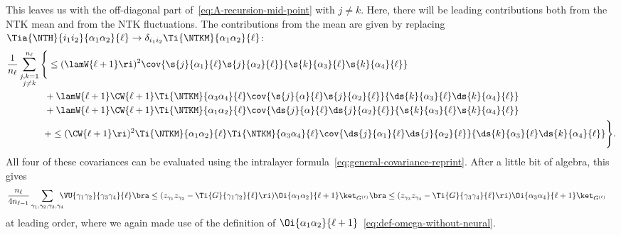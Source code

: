This leaves us with the off-diagonal part of~\eqref{eq:A-recursion-mid-point} with $j\ne k$. Here, there will be leading contributions both from the NTK mean and from the NTK fluctuations. The contributions from the mean are given by
replacing $\Tia{\NTH}{i_1i_2}{\alpha_1\alpha_2}{\ell} \to \delta_{i_1i_2}\Ti{\NTKM}{\alpha_1\alpha_2}{\ell}$:
\begin{align}\label{eq:A-recursion-mean}
&\frac{1}{n_{\ell}}\sum_{\substack{ j,k=1\\j\ne k}}^{n_{\ell}}\Bigg\{\le(\lamW{\ell+1}\ri)^2\cov{\s{j}{\alpha_1}{\ell} \s{j}{\alpha_2}{\ell}}{\s{k}{\alpha_3}{\ell} \s{k}{\alpha_4}{\ell}}   \\
&\quad \quad \quad \quad +\lamW{\ell+1}\CW{\ell+1}\Ti{\NTKM}{\alpha_3\alpha_4}{\ell}\cov{\s{j}{\alpha}{\ell} \s{j}{\alpha_2}{\ell}}{\ds{k}{\alpha_3}{\ell} \ds{k}{\alpha_4}{\ell} } \nonumber\\
&\quad \quad \quad \quad +\lamW{\ell+1}\CW{\ell+1}\Ti{\NTKM}{\alpha_1\alpha_2}{\ell}\cov{\ds{j}{\alpha}{\ell} \ds{j}{\alpha_2}{\ell}}{\s{k}{\alpha_3}{\ell} \s{k}{\alpha_4}{\ell}  }\nonumber\\
&\quad \quad \quad \quad +\le(\CW{\ell+1}\ri)^2\Ti{\NTKM}{\alpha_1\alpha_2}{\ell}\Ti{\NTKM}{\alpha_3\alpha_4}{\ell}\cov{\ds{j}{\alpha_1}{\ell} \ds{j}{\alpha_2}{\ell}}{\ds{k}{\alpha_3}{\ell} \ds{k}{\alpha_4}{\ell}}\Bigg\} .\nonumber
\end{align}
All four of these covariances can be evaluated using the intralayer formula~\eqref{eq:general-covariance-reprint}. After a little bit of algebra, this gives 
\begin{align}\label{eq:NTHA-piece2}%
&\frac{n_{\ell}}{4n_{\ell-1}}  \sum_{\gamma_1, \gamma_2, \gamma_3, \gamma_4} \!\!\!\!
\VU{\gamma_1 \gamma_2}{\gamma_3 \gamma_4}{\ell}
\bra\le(z_{\gamma_1} z_{\gamma_2} -\Ti{G}{\gamma_1 \gamma_2}{\ell} \ri)\Oi{\alpha_1\alpha_2}{\ell+1}\ket_{G^{(\ell)}}
\bra\le(z_{\gamma_3} z_{\gamma_4} -\Ti{G}{\gamma_3 \gamma_4}{\ell} \ri)\Oi{\alpha_3\alpha_4}{\ell+1}\ket_{G^{(\ell)}}\, 
\end{align}
at leading order, where we again made use of the definition of $\Oi{\alpha_1\alpha_2}{\ell+1}$~\eqref{eq:def-omega-without-neural}.

